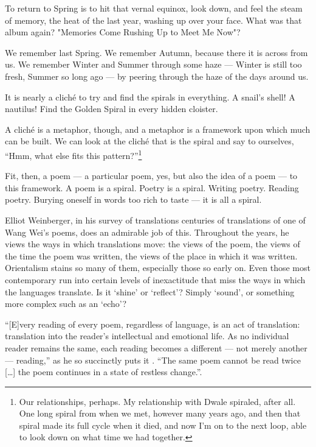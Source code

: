 \documentclass[12pt,oneside]{memoir}
\begin{document}
To return to Spring is to hit that vernal equinox, look down, and feel the steam of memory, the heat of the last year, washing up over your face. What was that album again? "Memories Come Rushing Up to Meet Me Now"?

We remember last Spring. We remember Autumn, because there it is across from us. We remember Winter and Summer through some haze --- Winter is still too fresh, Summer so long ago --- by peering through the haze of the days around us.

It is nearly a cliché to try and find the spirals in everything. A snail's shell! A nautilus! Find the Golden Spiral in every hidden cloister.

A cliché is a metaphor, though, and a metaphor is a framework upon which much can be built. We can look at the cliché that is the spiral and say to ourselves, ``Hmm, what else fits this pattern?''\footnote{Our relationships, perhaps. My relationship with Dwale spiraled, after all. One long spiral from when we met, however many years ago, and then that spiral made its full cycle when it died, and now I'm on to the next loop, able to look down on what time we had together.}

Fit, then, a poem --- a particular poem, yes, but also the idea of a poem --- to this framework. A poem is a spiral. Poetry is a spiral. Writing poetry. Reading poetry. Burying oneself in words too rich to taste --- it is all a spiral.

Elliot Weinberger, in his survey of translations centuries of translations of one of Wang Wei's poems, does an admirable job of this. Throughout the years, he views the ways in which translations move: the views of the poem, the views of the time the poem was written, the views of the place in which it was written. Orientalism stains so many of them, especially those so early on. Even those most contemporary run into certain levels of inexactitude that miss the ways in which the languages translate. Is it `shine' or `reflect'? Simply `sound', or something more complex such as an `echo'?

``{[E]}very reading of every poem, regardless of language, is an act of translation: translation into the reader's intellectual and emotional life. As no individual reader remains the same, each reading becomes a different --- not merely another --- reading,'' as he so succinctly puts it \parencite[46]{wangwei}. ``The same poem cannot be read twice {[\ldots]} the poem continues in a state of restless change.''. 
\end{document}
